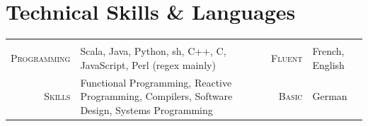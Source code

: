 \documentclass[a4paper,11pt]{article} %
\begin{document}

\section{Technical Skills \& Languages}
\begin{center}

\vspace{-0.3cm}
\begin{tabularx}{\textwidth}{rX|rl}

& & & \\
\textsc{\large{Programming}} & Scala, Java, Python, sh, C++, C, JavaScript, Perl (regex mainly) &
\textsc{\large{Fluent}} & French, English \\
\textsc{\large{Skills}} & Functional Programming, Reactive Programming, Compilers, Software Design, Systems Programming &
\textsc{\large{Basic}} & German \\

\end{tabularx}

\end{center}

\end{document}
